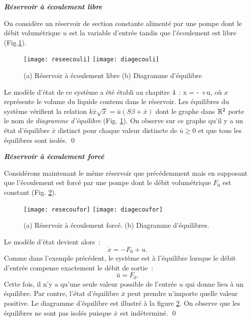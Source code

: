 \begin{exemple}{\bf{\em R\'eservoir \`a \'ecoulement libre}}

 On consid\`ere un r\'eservoir de section constante aliment\'e par une
pompe dont le d\'ebit
 volum\'etrique $u$ est la variable d'entr\'ee tandis que
l'\'ecoulement est libre (Fig.\ref{fig:diagecouli}). 
\begin{figure}[h] 
\begin{center}
\texttt{[image: reseecouli]}
\hspace{1cm}
\texttt{[image: diagecouli]}
\caption{(a) Réservoir à écoulement libre (b) Diagramme d'\'equilibre}
\label{fig:diagecouli}
\end{center} 
\end{figure}

Le  mod\`ele d'\'etat de ce syst\`eme a \'et\'e \'etabli au chapitre 4~:
\eqnn
\dot x = -  +u,
\eeqnn
o\`u $x$ repr\'esente le volume du liquide contenu dans le r\'eservoir.
Les \'equilibres du syst\`eme v\'erifient la relation $k \bar x \sqrt{\bar
x} = \bar u (S \beta + \bar x)$ dont le graphe dans $\mathbb{R}^2$ porte le nom de {\em
diagramme d'\'equilibre} (Fig. \ref{fig:diagecouli}).
On observe sur ce graphe qu'il y a un \'etat d'\'equilibre $\bar x$
distinct pour chaque valeur distincte de $\bar u \geq 0$ et que tous les
\'equilibres sont isol\'es. \qed
\end{exemple}
\vv

\begin{exemple}{\bf{\em R\'eservoir \`a \'ecoulement forc\'e}}

Consid\'erons maintenant le m\^eme r\'eservoir que pr\'ec\'edemment 
mais en supposant que l'\'ecoulement est forc\'e par une pompe dont le
d\'ebit volum\'etrique $F_0$ est constant (Fig. \ref{fig:diagecoufor}).
\begin{figure}[ht]
\begin{center}
\texttt{[image: resecoufor]}
\hspace{1cm}
\texttt{[image: diagecoufor]}
\caption{(a) Réservoir à écoulement forcé. (b) Diagramme d'\'equilibres.}
\label{fig:diagecoufor}
\end{center} 
\end{figure}
Le mod\`ele
d'\'etat devient alors~:
$$\dot x=-F_0 + u.$$
Comme dans l'exemple pr\'ec\'edent, le syst\`eme est \`a
l'\'equilibre lorsque le d\'ebit d'entr\'ee compense exactement le
d\'ebit de sortie~:
$$\bar u=F_0.$$
Cette fois, il n'y a qu'une seule valeur possible de l'entr\'ee $u$
qui donne lieu \`a un \'equilibre. Par contre, l'\'etat d'\'equilibre
$\bar x$ peut prendre n'importe quelle valeur positive. Le diagramme
d'\'equilibre est illustr\'e \`a la figure \ref{fig:diagecoufor}. On observe
que les
\'equilibres ne sont pas isol\'es puisque $\bar x$ est
ind\'etermin\'e. \qed
\end{exemple}
\vv

